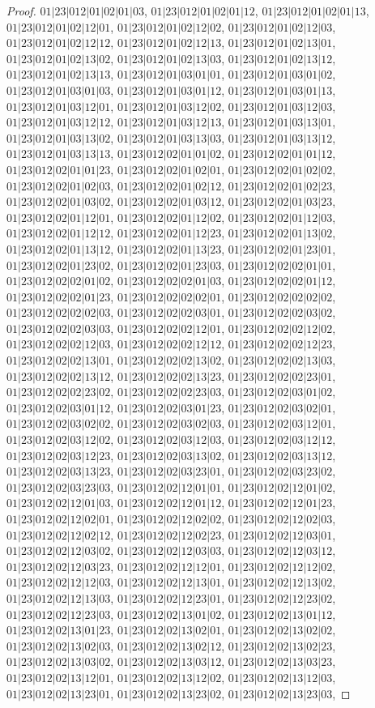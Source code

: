 \documentclass[12pt]{article}
\theoremstyle{plain}
\theoremstyle{definition}
\theoremstyle{remark}
\begin{document}
\begin{proof}
$01|23|012|01|02|01|03$, $01|23|012|01|02|01|12$, $01|23|012|01|02|01|13$, $01|23|012|01|02|12|01$, $01|23|012|01|02|12|02$, $01|23|012|01|02|12|03$, $01|23|012|01|02|12|12$, $01|23|012|01|02|12|13$, $01|23|012|01|02|13|01$, $01|23|012|01|02|13|02$, $01|23|012|01|02|13|03$, $01|23|012|01|02|13|12$, $01|23|012|01|02|13|13$, $01|23|012|01|03|01|01$, $01|23|012|01|03|01|02$, $01|23|012|01|03|01|03$, $01|23|012|01|03|01|12$, $01|23|012|01|03|01|13$, $01|23|012|01|03|12|01$, $01|23|012|01|03|12|02$, $01|23|012|01|03|12|03$, $01|23|012|01|03|12|12$, $01|23|012|01|03|12|13$, $01|23|012|01|03|13|01$, $01|23|012|01|03|13|02$, $01|23|012|01|03|13|03$, $01|23|012|01|03|13|12$, $01|23|012|01|03|13|13$, $01|23|012|02|01|01|02$, $01|23|012|02|01|01|12$, $01|23|012|02|01|01|23$, $01|23|012|02|01|02|01$, $01|23|012|02|01|02|02$, $01|23|012|02|01|02|03$, $01|23|012|02|01|02|12$, $01|23|012|02|01|02|23$, $01|23|012|02|01|03|02$, $01|23|012|02|01|03|12$, $01|23|012|02|01|03|23$, $01|23|012|02|01|12|01$, $01|23|012|02|01|12|02$, $01|23|012|02|01|12|03$, $01|23|012|02|01|12|12$, $01|23|012|02|01|12|23$, $01|23|012|02|01|13|02$, $01|23|012|02|01|13|12$, $01|23|012|02|01|13|23$, $01|23|012|02|01|23|01$, $01|23|012|02|01|23|02$, $01|23|012|02|01|23|03$, $01|23|012|02|02|01|01$, $01|23|012|02|02|01|02$, $01|23|012|02|02|01|03$, $01|23|012|02|02|01|12$, $01|23|012|02|02|01|23$, $01|23|012|02|02|02|01$, $01|23|012|02|02|02|02$, $01|23|012|02|02|02|03$, $01|23|012|02|02|03|01$, $01|23|012|02|02|03|02$, $01|23|012|02|02|03|03$, $01|23|012|02|02|12|01$, $01|23|012|02|02|12|02$, $01|23|012|02|02|12|03$, $01|23|012|02|02|12|12$, $01|23|012|02|02|12|23$, $01|23|012|02|02|13|01$, $01|23|012|02|02|13|02$, $01|23|012|02|02|13|03$, $01|23|012|02|02|13|12$, $01|23|012|02|02|13|23$, $01|23|012|02|02|23|01$, $01|23|012|02|02|23|02$, $01|23|012|02|02|23|03$, $01|23|012|02|03|01|02$, $01|23|012|02|03|01|12$, $01|23|012|02|03|01|23$, $01|23|012|02|03|02|01$, $01|23|012|02|03|02|02$, $01|23|012|02|03|02|03$, $01|23|012|02|03|12|01$, $01|23|012|02|03|12|02$, $01|23|012|02|03|12|03$, $01|23|012|02|03|12|12$, $01|23|012|02|03|12|23$, $01|23|012|02|03|13|02$, $01|23|012|02|03|13|12$, $01|23|012|02|03|13|23$, $01|23|012|02|03|23|01$, $01|23|012|02|03|23|02$, $01|23|012|02|03|23|03$, $01|23|012|02|12|01|01$, $01|23|012|02|12|01|02$, $01|23|012|02|12|01|03$, $01|23|012|02|12|01|12$, $01|23|012|02|12|01|23$, $01|23|012|02|12|02|01$, $01|23|012|02|12|02|02$, $01|23|012|02|12|02|03$, $01|23|012|02|12|02|12$, $01|23|012|02|12|02|23$, $01|23|012|02|12|03|01$, $01|23|012|02|12|03|02$, $01|23|012|02|12|03|03$, $01|23|012|02|12|03|12$, $01|23|012|02|12|03|23$, $01|23|012|02|12|12|01$, $01|23|012|02|12|12|02$, $01|23|012|02|12|12|03$, $01|23|012|02|12|13|01$, $01|23|012|02|12|13|02$, $01|23|012|02|12|13|03$, $01|23|012|02|12|23|01$, $01|23|012|02|12|23|02$, $01|23|012|02|12|23|03$, $01|23|012|02|13|01|02$, $01|23|012|02|13|01|12$, $01|23|012|02|13|01|23$, $01|23|012|02|13|02|01$, $01|23|012|02|13|02|02$, $01|23|012|02|13|02|03$, $01|23|012|02|13|02|12$, $01|23|012|02|13|02|23$, $01|23|012|02|13|03|02$, $01|23|012|02|13|03|12$, $01|23|012|02|13|03|23$, $01|23|012|02|13|12|01$, $01|23|012|02|13|12|02$, $01|23|012|02|13|12|03$, $01|23|012|02|13|23|01$, $01|23|012|02|13|23|02$, $01|23|012|02|13|23|03$, 
\end{proof}
\end{document}
